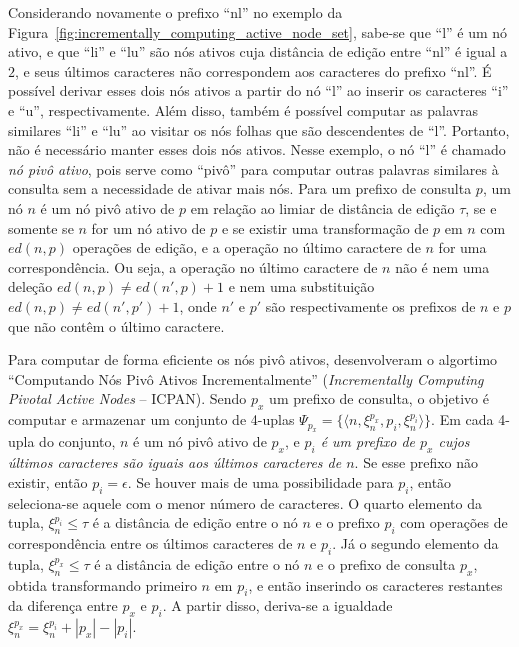 Considerando novamente o prefixo ``nl'' no exemplo da Figura~\ref{fig:incrementally_computing_active_node_set}, sabe-se que ``l'' é um nó ativo, e que ``li'' e ``lu'' são nós ativos cuja distância de edição entre ``nl'' é igual a $2$, e seus últimos caracteres não correspondem aos caracteres do prefixo ``nl''. É possível derivar esses dois nós ativos a partir do nó ``l'' ao inserir os caracteres ``i'' e ``u'', respectivamente. Além disso, também é possível computar as palavras similares ``li'' e ``lu'' ao visitar os nós folhas que são descendentes de ``l''. Portanto, não é necessário manter esses dois nós ativos. Nesse exemplo, o nó ``l'' é chamado \textit{nó pivô ativo}, pois serve como ``pivô'' para computar outras palavras similares à consulta sem a necessidade de ativar mais nós. Para um prefixo de consulta $p$, um nó $n$ é um nó pivô ativo de $p$ em relação ao limiar de distância de edição $\tau$, se e somente se $n$ for um nó ativo de $p$ e se existir uma transformação de $p$ em $n$ com $ed(n,p)$ operações de edição, e a operação no último caractere de $n$ for uma correspondência. Ou seja, a operação no último caractere de $n$ não é nem uma deleção $ed(n,p) \neq ed(n', p) + 1$ e nem uma substituição $ed(n,p) \neq ed(n', p') + 1$, onde $n'$ e $p'$ são respectivamente os prefixos de $n$ e $p$ que não contêm o último caractere. 

Para computar de forma eficiente os nós pivô ativos, \cite{li2011efficient} desenvolveram o algortimo ``Computando Nós Pivô Ativos Incrementalmente'' (\textit{Incrementally Computing Pivotal Active Nodes } -- ICPAN). Sendo $p_{x}$ um prefixo de consulta, o objetivo é computar e armazenar um conjunto de 4-uplas $\Psi_{p_{x}} = \{ \langle n, \xi_{n}^{p_{x}}, p_{i}, \xi_{n}^{p_{i}} \rangle \}$. Em cada 4-upla do conjunto, $n$ é um nó pivô ativo de $p_{x}$, e \textit{$p_{i}$ é um prefixo de $p_{x}$ cujos últimos caracteres são iguais aos últimos caracteres de $n$}. Se esse prefixo não existir, então $p_{i} = \epsilon$. Se houver mais de uma possibilidade para $p_{i}$, então seleciona-se aquele com o menor número de caracteres. O quarto elemento da tupla, $\xi_{n}^{p_{i}} \leq \tau$ é a distância de edição entre o nó $n$ e o prefixo $p_{i}$ com operações de correspondência entre os últimos caracteres de $n$ e $p_{i}$. Já o segundo elemento da tupla, $\xi_{n}^{p_{x}} \leq \tau$ é a distância de edição entre o nó $n$ e o prefixo de consulta $p_{x}$, obtida transformando primeiro $n$ em $p_{i}$, e então inserindo os caracteres restantes da diferença entre $p_{x}$ e $p_{i}$. A partir disso, deriva-se a igualdade $\xi_{n}^{p_{x}}=\xi_{n}^{p_{i}} + |p_{x}|-|p_{i}|$.


